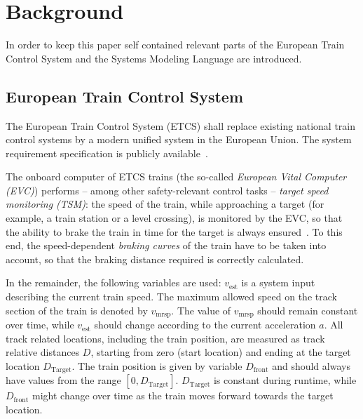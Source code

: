 \section{Background}
In order to keep this paper self contained relevant parts of the European Train Control System and the Systems Modeling Language are introduced. 
\subsection{European Train Control System}
The European Train Control System (ETCS) shall replace existing national train control systems by a modern unified
 system in the European Union. The system
requirement specification is publicly available~\cite{ETCSSRS-Principles}. 

The onboard computer of ETCS trains (the so-called \emph{European Vital Computer
(EVC)}) performs -- among other safe\-ty-relevant control tasks -- \emph{target
speed monitoring (TSM)}: the speed of the train, while approaching a target (for
example, a train station or a level crossing), is monitored by the EVC, so that
the ability to brake the train in time for the target is always
ensured~\cite{ETCSSRS-Principles}. To this end, the speed-dependent
\emph{braking curves} of the train have to be taken into account, so that the
braking distance required is correctly calculated.


In the remainder, the following variables are used: $v_\text{est}$ is a system input describing the 
current train speed. The maximum allowed speed on the track section of the train is denoted by $v_\text{mrsp}$. The value
of $v_\text{mrsp}$ should remain constant over time, while $v_\text{est}$ should change according to the current
acceleration $a$.  
All track related locations, including the train position, are measured as track relative distances $D$,
starting from zero (start location) and ending at the target location $D_\text{Target}$.
The train position is given by variable $D_\text{front}$ and should always have
values from the range $[0,D_\text{Target}]$. $D_\text{Target}$ is constant during runtime, while $D_\text{front}$ might change
over time as the train moves forward towards the target location. 

